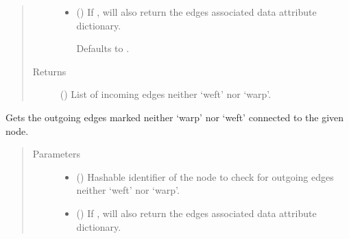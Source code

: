 \documentclass[letterpaper,10pt,english]{sphinxmanual}
\begin{document}
\begin{fulllineitems}
\begin{fulllineitems}
\begin{quote}
\begin{description}
\begin{itemize}
\item {} 
 (\sphinxstyleliteralemphasis{\sphinxupquote{, }}) \textendash{} 
If , will also return the edges associated data attribute
dictionary.

Defaults to .


\end{itemize}

\item[{Returns}] \leavevmode
{} () \textendash{} List of incoming edges neither ‘weft’ nor ‘warp’.

\end{description}\end{quote}

\end{fulllineitems}


\begin{fulllineitems}
\label{\detokenize{cockatoo:cockatoo.KnitDiNetwork.node_contour_edges_out}}
Gets the outgoing edges marked neither ‘warp’ nor ‘weft’ connected to
the given node.
\begin{quote}\begin{description}
\item[{Parameters}] \leavevmode\begin{itemize}
\item {} 
 () \textendash{} Hashable identifier of the node to check for outgoing edges neither
‘weft’ nor ‘warp’.

\item {} 
 (\sphinxstyleliteralemphasis{\sphinxupquote{, }}) \textendash{} 
If , will also return the edges associated data attribute
dictionary.


\end{itemize}
\end{description}
\end{quote}
\end{fulllineitems}
\end{fulllineitems}
\end{document}
